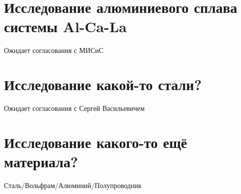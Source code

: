 \FloatBarrier

\section{Исследование алюминиевого сплава системы Al-Ca-La}\label{sec:ch4/sect2}
Ожидает согласования с МИСиС
\FloatBarrier

\section{Исследование какой-то стали?}\label{sec:ch4/sect3}
Ожидает согласования с Сергей Васильевичем
\FloatBarrier
\section{Исследование какого-то ещё материала?}\label{sec:ch4/sect4}
Сталь/Вольфрам/Алюминий/Полупроводник

\FloatBarrier
\clearpage